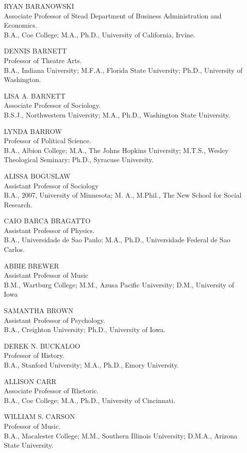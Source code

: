 \documentclass[
  letterpaper,
]{scrbook}
\begin{document}
RYAN BARANOWSKI\\
Associate Professor of Stead Department of Business Administration and
Economics.\\
B.A., Coe College; M.A., Ph.D., University of California, Irvine.

DENNIS BARNETT\\
Professor of Theatre Arts.\\
B.A., Indiana University; M.F.A., Florida State University; Ph.D.,
University of Washington.

LISA A. BARNETT\\
Associate Professor of Sociology.\\
B.S.J., Northwestern University; M.A., Ph.D., Washington State
University.

LYNDA BARROW\\
Professor of Political Science.\\
B.A., Albion College; M.A., The Johns Hopkins University; M.T.S., Wesley
Theological Seminary; Ph.D., Syracuse University.

ALISSA BOGUSLAW\\
Assistant Professor of Sociology\\
B.A., 2007, University of Minnesota; M. A., M.Phil., The New School for
Social Research.

CAIO BARCA BRAGATTO\\
Assistant Professor of Physics.\\
B.A., Universidade de Sao Paulo; M.A., Ph.D., Universidade Federal de
Sao Carlos.

ABBIE BREWER\\
Assistant Professor of Music\\
B.M., Wartburg College; M.M., Azusa Pacific University; D.M., University
of Iowa

SAMANTHA BROWN\\
Assistant Professor of Psychology.\\
B.A., Creighton University; Ph.D., University of Iowa.

DEREK N. BUCKALOO\\
Professor of History.\\
B.A., Stanford University; M.A., Ph.D., Emory University.

ALLISON CARR\\
Associate Professor of Rhetoric.\\
B.A., Coe College; M.A., Ph.D., University of Cincinnati.

WILLIAM S. CARSON\\
Professor of Music.\\
B.A., Macalester College; M.M., Southern Illinois University; D.M.A.,
Arizona State University.
\end{document}
